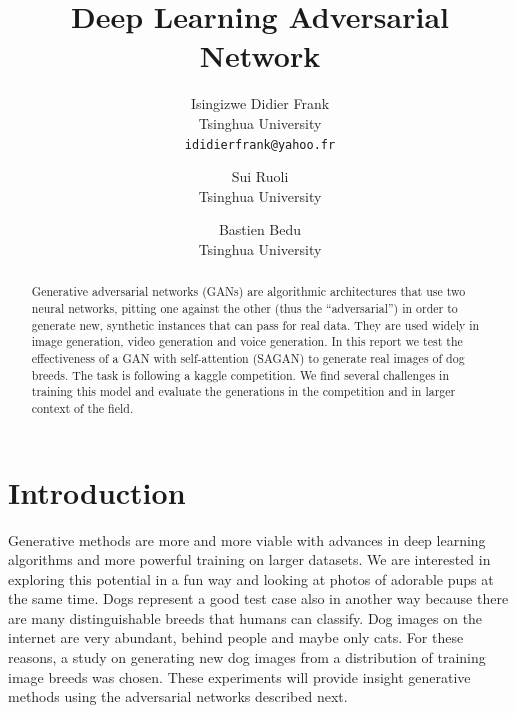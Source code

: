 \documentclass[10pt,twocolumn,letterpaper]{article}
\begin{document}
\title{Deep Learning Adversarial Network}

\author{Isingizwe Didier Frank\\
Tsinghua University\\
{\tt\small ididierfrank@yahoo.fr}
\and
Sui Ruoli\\
Tsinghua University\\
\and
Bastien Bedu\\
Tsinghua University\\
}

\maketitle

\begin{abstract}
   Generative adversarial networks (GANs) are algorithmic architectures
   that use two neural networks, pitting one against the other
   (thus the “adversarial”) in order to generate new, synthetic instances
   that can pass for real data. They are used widely in image generation,
   video generation and voice generation.  In this report we test the
   effectiveness of a GAN with self-attention (SAGAN) to generate real
   images of dog breeds. The task is following a kaggle competition. We
   find several challenges in training this model and evaluate the
   generations in the competition and in larger context of the field.
\end{abstract}

\section{Introduction}

Generative methods are more and more viable with advances in deep learning
algorithms and more powerful training on larger datasets.
We are interested in exploring this potential in a fun way and looking at
photos of adorable pups at the same time. Dogs represent a good test case
also in another way because there are many distinguishable breeds that
humans can classify. Dog images on the internet are very abundant, behind
people and maybe only cats. For these reasons, a study on generating new
dog images from a distribution of training image breeds was chosen. These
experiments will provide insight generative methods using the adversarial
networks described next.
\end{document}

